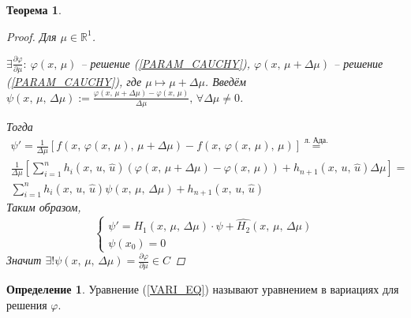 \documentclass[a4paper,12pt]{article}
\renewcommand{\phi}{\ensuremath{\varphi}}
\theoremstyle{plain}
\newtheorem{theorem}{Теорема}[section]
\theoremstyle{definition}
\newtheorem{definition}{Определение}[section]
\theoremstyle{remark}
\begin{document}
\begin{theorem}
	\begin{proof}
		Для $\mu \in \mathbb{R}^1$.

		$\exists \frac{\partial \phi}{\partial \mu}:\: \phi(x,\,\mu)$ -- решение (\ref*{PARAM_CAUCHY}), $\phi(x,\, \mu + \Delta\mu)$ -- решение (\ref*{PARAM_CAUCHY}), где $\mu \mapsto \mu + \Delta\mu$. Введём $\psi(x,\,\mu,\,\Delta\mu) := \frac{\phi(x,\, \mu + \Delta\mu) - \phi(x,\, \mu)}{\Delta\mu},\, \forall \Delta\mu \neq 0$.

		Тогда
		\begin{align*}
			\psi' = \frac{1}{\Delta\mu}\left[f(x,\, \phi(x,\, \mu),\, \mu + \Delta\mu) - f(x,\,\phi(x,\, \mu),\, \mu)\right] \overset{\text{л. Ада.}}{=}            \\
			\frac{1}{\Delta\mu}\left[\sum_{i=1}^n h_i(x,\, u,\,\hat{u})(\phi(x,\, \mu + \Delta\mu) - \phi(x,\, \mu)) + h_{n + 1}(x,\,u,\,\hat{u})\Delta\mu\right] = \\
			\sum_{i = 1}^n h_i(x,\,u,\,\hat{u})\psi(x,\,\mu,\,\Delta\mu) + h_{n + 1}(x,\,u,\,\hat{u})
		\end{align*}
		Таким образом,
		\begin{equation}\label{VARI_EQ}
			\begin{cases}
				\psi' = H_1(x,\,\mu,\,\Delta\mu)\cdot\psi + \hat{H_2}(x,\,\mu,\,\Delta\mu) \\
				\psi(x_0) = 0
			\end{cases}
		\end{equation}
		Значит $\exists! \psi(x,\,\mu,\, \Delta\mu) = \frac{\partial \phi}{\partial \mu} \in C$
	\end{proof}
\end{theorem}

\begin{definition}
	Уравнение (\ref*{VARI_EQ}) называют уравнением в вариациях для решения $\phi$.
\end{definition}
\end{document}
